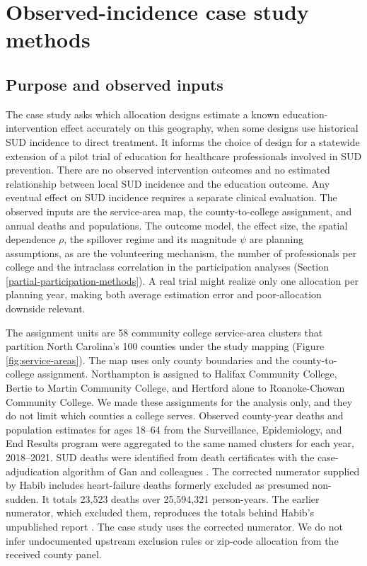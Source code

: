 \documentclass[11pt]{article}
\begin{document}
\FloatBarrier
\section{Observed-incidence case study methods}\label{observed-incidence-application-full-methods-and-results}



\subsection{Purpose and observed inputs}\label{purpose-and-observed-inputs}


The case study asks which allocation designs estimate a known
education-intervention effect accurately on this geography, when some
designs use historical SUD incidence to direct treatment. It informs the
choice of design for a statewide extension of a pilot trial of education
for healthcare professionals involved in SUD prevention. There are no observed intervention outcomes and no
estimated relationship between local SUD incidence and the education
outcome. Any eventual effect on SUD incidence requires a separate
clinical evaluation. The observed inputs are the service-area map, the
county-to-college assignment, and annual deaths and populations. The
outcome model, the effect size, the spatial dependence $\rho$, the
spillover regime and its magnitude $\psi$ are planning assumptions, as
are the volunteering mechanism, the number of professionals per college
and the intraclass correlation in the participation analyses (Section
\ref{partial-participation-methods}). A real trial might realize only one allocation per
planning year, making both average estimation error and poor-allocation
downside relevant.

The assignment units are 58 community college service-area clusters that
partition North Carolina's 100 counties under the study mapping (Figure
\ref{fig:service-areas}). The map uses only county boundaries and the county-to-college assignment. Northampton is assigned to Halifax Community
College, Bertie to Martin Community College, and Hertford alone to
Roanoke-Chowan Community College. We made these assignments for the
analysis only, and they do not limit which counties a college serves. Observed county-year deaths and population estimates for ages 18--64 from the Surveillance, Epidemiology, and End Results program were aggregated to the same named clusters for
each year, 2018--2021. SUD deaths were identified from death
certificates with the case-adjudication algorithm of Gan and colleagues
\citep{gan_factors_2019}. The corrected numerator supplied by Habib
includes heart-failure deaths formerly excluded as presumed non-sudden.
It totals 23,523
deaths over 25,594,321 person-years. The earlier numerator, which
excluded them, reproduces the totals behind Habib's unpublished report
\citep{habib_temporal_2026}. The case study uses the corrected
numerator. We do not infer undocumented upstream exclusion rules or zip-code
allocation from the received county panel.
\end{document}
